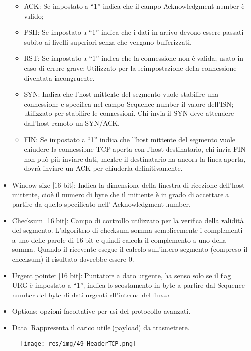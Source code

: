 \begin{itemize}
\begin{itemize}
\item	ACK: Se impostato a “1” indica che il campo Acknowledgment number è valido;
\item	PSH: Se impostato a “1” indica che i dati in arrivo devono essere passati subito ai livelli superiori senza che vengano bufferizzati.
\item	RST: Se impostato a “1” indica che la connessione non è valida; usato in caso di errore grave; Utilizzato per la reimpostazione della connessione diventata incongruente.
\item	SYN: Indica che l'host mittente del segmento vuole stabilire una connessione e specifica nel campo Sequence number il valore dell'ISN; utilizzato per stabilire le connessioni. Chi invia il SYN deve attendere dall'host remoto un SYN/ACK.
\item	FIN: Se impostato a “1” indica che l'host mittente del segmento vuole chiudere la connessione TCP aperta con l'host destinatario, chi invia FIN non può più inviare dati, mentre il destinatario ha ancora la linea aperta, dovrà inviare un ACK per chiuderla definitivamente.
\end{itemize}
\item	Window size [16 bit]: Indica la dimensione della finestra di ricezione dell'host mittente, cioè il numero di byte che il mittente è in grado di accettare a partire da quello specificato nell' Acknowledgment number.
\item	Checksum [16 bit]: Campo di controllo utilizzato per la verifica della validità del segmento. L'algoritmo di checksum somma semplicemente i complementi a uno delle parole di 16 bit e quindi calcola il complemento a uno della somma. Quando il ricevente esegue il calcolo sull'intero segmento (compreso il checksum) il risultato dovrebbe essere 0.
\item	Urgent pointer [16 bit]: Puntatore a dato urgente, ha senso solo se il flag URG è impostato a “1”, indica lo scostamento in byte a partire dal Sequence number del byte di dati urgenti all'interno del flusso.
\item	Options: opzioni facoltative per usi del protocollo avanzati.
\item	Data: Rappresenta il carico utile (payload) da trasmettere.
\end{itemize}

\begin{figure}[H]
\centering
\texttt{[image: res/img/49\_HeaderTCP.png]}
\end{figure}

